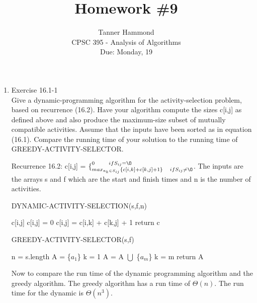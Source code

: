 \documentclass[12pt]{article}
\begin{document}
 
 
 
\title{Homework \#9}%
\author{Tanner Hammond\\ %
CPSC 395 - Analysis of Algorithms
\\ Due: Monday, 19} %
\date{}
\maketitle

\begin{enumerate}
\item Exercise 16.1-1 \\
Give a dynamic-programming algorithm for the activity-selection problem, based on recurrence (16.2). Have your algorithm compute the sizes c[i,j] as defined above and also produce the maximum-size subset of mutually compatible activities. Assume that the inputs have been sorted as in equation (16.1). Compare the running time of your solution to the running time of GREEDY-ACTIVITY-SELECTOR.

Recurrence 16.2: c[i,j] = $\{^{0 \qquad if S_{ij} = \O}_{max_{a_k \in S_{ij}} \{c[i,k] + c[k,j] + 1\}\quad if S_{ij} \neq \O}$. The inputs are the arrays s and f which are the start and finish times and n is the number of activities.

DYNAMIC-ACTIVITY-SELECTION(s,f,n)
\begin{algorithmic}
\STATE c[i,j]
\STATE c[i,j] = 0
\STATE c[i,j] = c[i,k] + c[k,j] + 1
\ENDIF
\ENDFOR
\ENDFOR
\ENDFOR
\STATE return c
\end{algorithmic}


GREEDY-ACTIVITY-SELECTOR(s,f)
\begin{algorithmic}
\STATE n = s.length
\STATE A = \{$a_1$\}
\STATE k = 1
\STATE A = A $\bigcup$ \{$a_m$\}
\STATE k = m
\ENDIF
\ENDFOR
\STATE return A
\end{algorithmic}

Now to compare the run time of the dynamic programming algorithm and the greedy algorithm. The greedy algorithm has a run time of $\Theta(n)$. The run time for the dynamic is $\Theta(n^3)$.


\end{enumerate}
\end{document}
